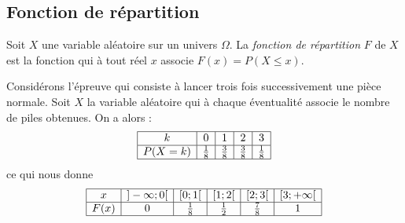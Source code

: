                   \subsection{Fonction de r\'epartition}
                        Soit $X$ une variable al\'eatoire sur un univers $\Omega$.
                        La \emph{fonction de r\'epartition} $F$ de $X$ est la fonction qui 
                        \`a tout r\'eel $x$ associe $F(x) = P(X \leq x)$.
                        \begin{ex}
                              Consid\'erons l'\'epreuve qui consiste \`a lancer trois fois successivement une pi\`ece normale.
                              Soit $X$ la variable al\'eatoire qui \`a chaque \'eventualit\'e associe le 
                              nombre de piles obtenues.
                              On a alors : 
                              \[
                                    \begin{array}{|c|c|c|c|c|}
                                          \hline
                                          k       &       0       &       1       &       2       &       3       \\
                                          \hline
                                          P(X=k)  &  \frac{1}{8}  &  \frac{3}{8}  &   \frac{3}{8} &  \frac{1}{8}  \\
                                           \hline
                                    \end{array}
                              \]
                              ce qui nous donne
                              \[
                                    \begin{array}{|c|c|c|c|c|c|}
                                          \hline
                                          x    & ]-\infty ; 0[ & [0;1[       & [1;2[       & [2;3[       & [3;+\infty[       \\
                                          \hline
                                          F(x) &       0       & \frac{1}{8} & \frac{1}{2} & \frac{7}{8} &       1           \\
                                          \hline
                                    \end{array}
                              \]
                              \begin{figure}[H]
                              \centering
                                    \begin{tikzpicture}[line cap=round,line join=round,>=triangle 45,x=1.0cm,y=5.0cm]

\end{tikzpicture}
\end{figure}
\end{ex}
